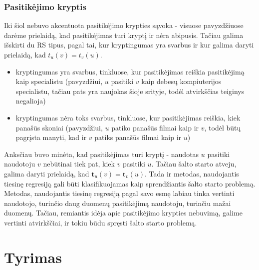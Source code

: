 \documentclass{VUMIFInfMagistrinis}
\begin{document}
\subsubsection{Pasitikėjimo kryptis}
Iki šiol nebuvo akcentuota pasitikėjimo krypties sąvoka - visuose pavyzdžiuose darėme prielaidą, kad pasitikėjimas turi kryptį ir nėra abipusis. Tačiau galima išskirti du RS tipus, pagal tai, kur kryptingumas yra svarbus ir kur galima daryti prielaidą, kad $t_u(v)= t_v(u)$.
\begin{itemize}
	\item kryptingumas yra svarbus, tinkluose, kur pasitikėjimas reiškia pasitikėjimą kaip specialistu (pavyzdžiui, $u$ pasitiki $v$ kaip debesų kompiuterijos specialistu, tačiau pats yra naujokas šioje srityje, todėl atvirkščias teiginys negalioja)
	\item kryptingumas nėra toks svarbus, tinkluose, kur pasitikėjimas reiškia, kiek panašūs skoniai (pavyzdžiui, $u$ patiko panašūs filmai kaip ir $v$, todėl būtų pagrįsta manyti, kad ir $v$ patiks panašūs filmai kaip ir $u$)
\end{itemize}
Anksčiau buvo minėta, kad pasitikėjimas turi kryptį - naudotas $u$ pasitiki naudotoju $v$ nebūtinai tiek pat, kiek $v$ pasitiki $u$. Tačiau šalto starto atveju, galima daryti prielaidą, kad $\boldsymbol{t}_u(v) = \boldsymbol{t}_v(u)$. Tada ir metodas, naudojantis tiesinę regresiją gali būti klasifikuojamas kaip sprendžiantis šalto starto problemą.
\newline
\indent
Metodas, naudojantis tiesinę regresiją pagal savo esmę labiau tinka vertinti naudotojo, turinčio daug duomenų pasitikėjimą naudotoju, turinčiu mažai duomenų. Tačiau, remiantis idėja apie pasitikėjimo krypties nebuvimą, galime vertinti atvirkščiai, ir tokiu būdu spręsti šalto starto problemą.

\section{Tyrimas}
\end{document}
